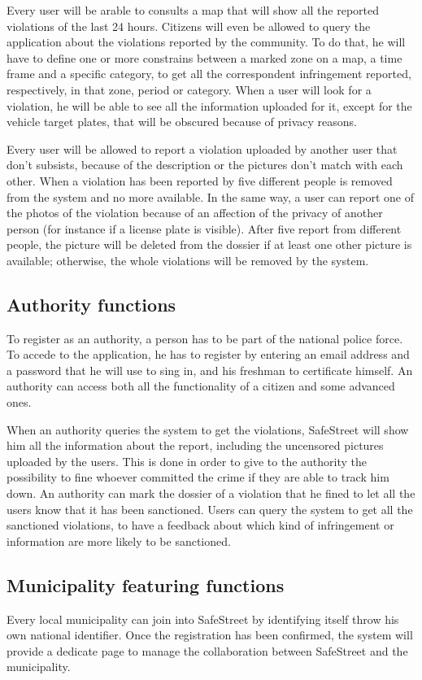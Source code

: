 \documentclass[../RASD.tex]{subfiles}
\begin{document}
    Every user will be arable to consults a map that will show all the reported violations of the last 24 hours. Citizens will even be allowed to query the application about the violations reported by the community. To do that, he will have to define one or more constrains between a marked zone on a map, a time frame and a specific category, to get all the correspondent infringement reported, respectively, in that zone, period or category. When a user will look for a violation, he will be able to see all the information uploaded for it, except for the vehicle target plates, that will be obscured because of privacy reasons.

    Every user will be allowed to report a violation uploaded by another user that don’t subsists, because of the description or the pictures don’t match with each other. When a violation has been reported by five different people is removed from the system and no more available. In the same way, a user can report one of the photos of the violation because of an affection of the privacy of another person (for instance if a license plate is visible). After five report from different people, the picture will be deleted from the dossier if at least one other picture is available; otherwise, the whole violations will be removed by the system.
    \subsection{Authority functions}\label{subsec:authority-functions}
    To register as an authority, a person has to be part of the national police force. To accede to the application, he has to register by entering an email address and a password that he will use to sing in, and his freshman to certificate himself. An authority can access both all the functionality of a citizen and some advanced ones.

    When an authority queries the system to get the violations, SafeStreet will show him all the information about the report, including the uncensored pictures uploaded by the users. This is done in order to give to the authority the possibility to fine whoever committed the crime if they are able to track him down. An authority can mark the dossier of a violation that he fined to let all the users know that it has been sanctioned. Users can query the system to get all the sanctioned violations, to have a feedback about which kind of infringement or information are more likely to be sanctioned.
    \subsection{Municipality featuring functions}\label{subsec:municipality-featuring-functions}
    Every local municipality can join into SafeStreet by identifying itself throw his own national identifier. Once the registration has been confirmed, the system will provide a dedicate page to manage the collaboration between SafeStreet and the municipality.
\end{document}
